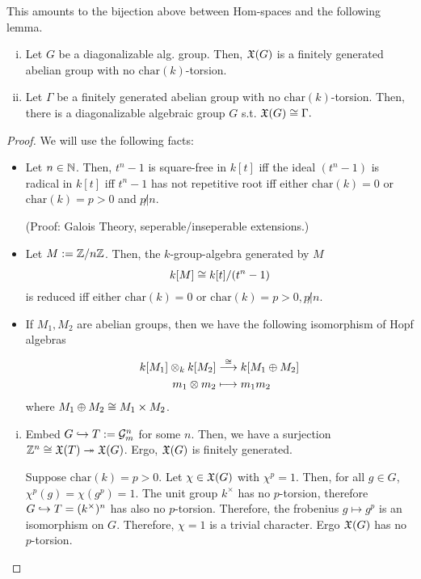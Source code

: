 This amounts to the bijection above between Hom-spaces and the following lemma.
\begin{lemma}
	\begin{enumerate}[(i)]
		\item Let $G$ be a diagonalizable alg. group. Then, $\mathfrak{X}(G)$ is a finitely generated abelian group with no $\mathrm{char}(k)$-torsion.
		\item Let $\Gamma$ be a finitely generated abelian group with no $\mathrm{char}(k)$-torsion. Then, there is a diagonalizable algebraic group $G$ s.t. $\mathfrak{X}(G) \overset{}{\cong} \Gamma.$
	\end{enumerate}
\end{lemma}
\newcommand{\chr}{\mathrm{char}}
\begin{proof}
We will use the following facts:
\begin{itemize}
	\item Let $n \in \mathbb{N}$. Then, 
	$t^n - 1$ is square-free in $k[t]$ iff the ideal $(t^n - 1)$ is radical in $k[t]$ iff $t^n -1$ has not repetitive root iff either $\chr(k) = 0$ or $\chr(k) = p > 0$ and $p\not | n$.
	
	(Proof: Galois Theory, seperable/inseperable extensions.)
	
	\item Let $M:= \mathbb{Z}/n\mathbb{Z}$. Then, the $k$-group-algebra generated by $M$ 
	\[k[M] \overset{}{\cong} k[t] / (t^n - 1)\]
	is reduced iff either $\chr(k) = 0$ or $\chr(k) = p > 0, p\not| n$.
	
	\item If $M_1, M_2$ are abelian groups, then we have the following isomorphism of Hopf algebras
	\begin{align*}
	k[M_1] \otimes_k k[M_2] &\overset{\overset{}{\cong}}{\longrightarrow} k[M_1 \oplus M_2]\\
	m_1 \otimes m_2 & \longmapsto m_1m_2
	\end{align*}
	where $M_1 \oplus M_2 \overset{}{\cong} M_1 \times M_2$.
\end{itemize}
\begin{enumerate}[(i)]
	\item Embed $G \overset{}{\hookrightarrow} T := \mathcal{G}^n_m$ for some $n$. Then, we have a surjection $\mathbb{Z}^n\overset{}{\cong} \mathfrak{X}(T)  \overset{}{\twoheadrightarrow} \mathfrak{X}(G)$. Ergo, $\mathfrak{X}(G)$ is finitely generated.
	
	Suppose $\chr(k) = p > 0$. Let $\chi \in \mathfrak{X}(G)$ with $\chi^p = 1$. Then, for all $g \in G$, $\chi^p(g) = \chi(g^p) = 1$. The unit group $k^\times$ has no $p$-torsion, therefore $G \overset{}{\hookrightarrow} T = (k^\times)^n$ has also no $p$-torsion. Therefore, the frobenius $g \mapsto g^p$ is an isomorphism on $G$. Therefore, $\chi = 1$ is a trivial character. Ergo $\mathfrak{X}(G)$ has no $p$-torsion.
	

\end{enumerate}
\end{proof}
